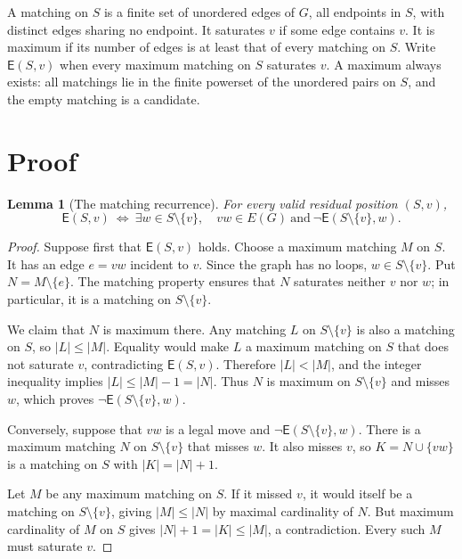 \documentclass[10pt,letterpaper]{article}
\newtheorem{lemma}{Lemma}
\newcommand{\Ess}{\mathsf{E}}
\begin{document}
A matching on $S$ is a finite set of unordered edges of $G$, all endpoints in
$S$, with distinct edges sharing no endpoint. It saturates $v$ if some edge
contains $v$. It is maximum if its number of edges is at least that of every
matching on $S$. Write $\Ess(S,v)$ when every maximum matching on $S$ saturates
$v$. A maximum always exists: all matchings lie in the finite powerset of the
unordered pairs on $S$, and the empty matching is a candidate.

\newpage
\section*{Proof}
\begin{lemma}[The matching recurrence]
For every valid residual position $(S,v)$,
\[
 \Ess(S,v)\ \Longleftrightarrow\
 \exists w\in S\setminus\{v\},\quad vw\in E(G)
 \ \text{and}\ \neg\Ess(S\setminus\{v\},w).
\]
\end{lemma}
\begin{proof}
Suppose first that $\Ess(S,v)$ holds. Choose a maximum matching $M$ on $S$.
It has an edge $e=vw$ incident to $v$. Since the graph has no loops,
$w\in S\setminus\{v\}$. Put $N=M\setminus\{e\}$.
The matching property ensures that $N$ saturates neither $v$ nor $w$;
in particular, it is a matching on $S\setminus\{v\}$.

We claim that $N$ is maximum there. Any matching $L$ on $S\setminus\{v\}$
is also a matching on $S$, so $|L|\leq |M|$. Equality would make $L$ a maximum
matching on $S$ that does not saturate $v$, contradicting $\Ess(S,v)$.
Therefore $|L|<|M|$, and the integer inequality implies
$|L|\leq |M|-1=|N|$. Thus $N$ is maximum on $S\setminus\{v\}$ and misses $w$,
which proves $\neg\Ess(S\setminus\{v\},w)$.

Conversely, suppose that $vw$ is a legal move and
$\neg\Ess(S\setminus\{v\},w)$. There is a maximum matching $N$ on
$S\setminus\{v\}$ that misses $w$. It also misses $v$, so
$K=N\cup\{vw\}$ is a matching on $S$ with $|K|=|N|+1$.

Let $M$ be any maximum matching on $S$. If it missed $v$, it would itself be
a matching on $S\setminus\{v\}$, giving $|M|\leq |N|$ by maximal cardinality
of $N$. But maximum cardinality of $M$ on $S$ gives
$|N|+1=|K|\leq |M|$, a contradiction. Every such $M$ must saturate $v$.
\end{proof}
\end{document}
